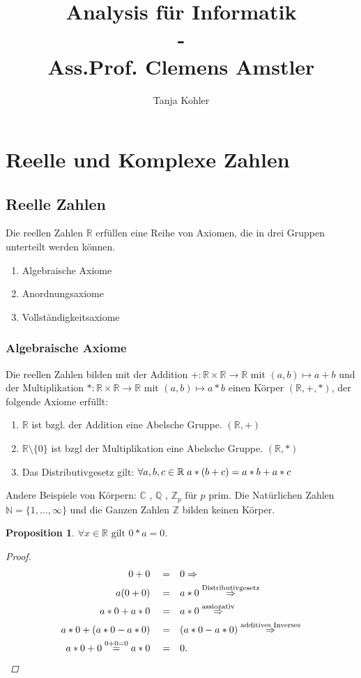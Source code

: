 \documentclass[a4paper,titlepage,oneside]{article}
\author{Tanja Kohler}
\title{Analysis für Informatik\small{ \\ - \\ Ass.Prof. Clemens Amstler}}
\def\C{\ensuremath{\mathbb{C}} }
\def\N{\ensuremath{\mathbb{N}} }
\def\Q{\ensuremath{\mathbb{Q}} }
\def\Z{\ensuremath{\mathbb{Z}} }
\def\R{\ensuremath{\mathbb{R}} }
\newcommand{\alQ}[1]{\ensuremath{\quad#1&\quad}}
\newcommand{\fa}{\ensuremath{\forall}}
\def\sp{\hspace{0,1cm}}
\theoremstyle{thmstyle}
\newtheorem{prop}[satz]{Proposition}
\begin{document}
\maketitle

\section{Reelle und Komplexe Zahlen}
\subsection{Reelle Zahlen}
Die reellen Zahlen \R erfüllen eine Reihe von Axiomen, die in drei Gruppen unterteilt werden können.

\begin{enumerate}[label=\Roman*.]
\item Algebraische Axiome
\item Anordnungsaxiome
\item Vollständigkeitsaxiome
\end{enumerate}

\subsubsection{Algebraische Axiome}
Die reellen Zahlen bilden mit der Addition \( + : \R \times \R \to \R \text{ mit } (a,b) \mapsto a + b\) und der Multiplikation \( * :  \R \times \R \to \R \text{ mit } (a,b) \mapsto a * b \)
einen Körper \((\R, +, * )\), der folgende Axiome erfüllt: 
\begin{enumerate}[label=\arabic*)]
\item \(\R\) ist bzgl. der Addition eine Abelsche Gruppe. \((\R,+)\)
\item \(\R \setminus \{0\}\) ist bzgl der Multiplikation eine Abelsche Gruppe. \((\R,*)\)
\item Das Distributivgesetz gilt: \( \fa a,b,c \in \R \sp a * (b + c) = a * b + a * c\)
\end{enumerate}
Andere Beispiele von Körpern: \C, \Q, \(\Z_p \text{ für }p\) prim.
Die Natürlichen Zahlen \(\N = \{1,\dots,\infty \} \) und die Ganzen Zahlen \Z bilden keinen Körper.

\begin{prop}
\(\fa x \in \R \text{ gilt } 0 * a = 0\).
\begin{proof}
\begin{align*}
0+0 \alQ{=} 0 \Rightarrow \\
a ( 0 + 0 )\alQ{=} a * 0 \overset{\text{Distributivgesetz}}{\Rightarrow} \\
a * 0 + a * 0 \alQ{=} a * 0  \overset{\text{assiozativ}}{\Rightarrow} \\
a * 0 + (a * 0 - a * 0) \alQ{=} (a * 0 - a * 0) \overset{\text{additives Inverses}}{\Rightarrow} \\
a * 0 +  0 \overset{0+0=0}{=} a * 0 \alQ{=} 0.
\end{align*}
\end{proof}
\end{prop}
\end{document}
